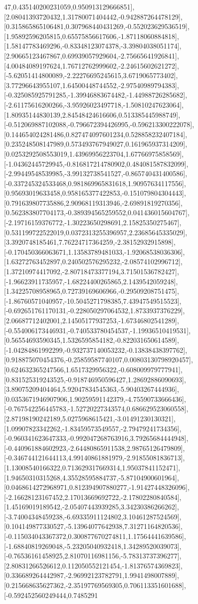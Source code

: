 \documentclass{article}
\begin{document}
47,0.435140200231059,0.950913129666851],[2.08041393720432,1.31780071404442,-0.942887264478129],[0.315865865106481,0.307968440431269,-0.552023629536519],[1.95892596205815,0.65575856617606,-1.87118060884818],[1.58147783469296,-0.83348123074378,-3.39804038051174],[2.90665123467867,0.69939057929604,-2.75665641926841],[4.00484089197624,1.76712762999602,-2.24615602621272],[-5.62051414800089,-2.22276695245615,3.6719065773402],[3.77296643955107,1.64500448744552,-2.97540989794383],[-0.325085925791285,-1.39946883674482,-1.44988726285682],[-2.61175616200266,-3.95926023497718,-1.50810247623064],[1.80935144830139,2.84548424616606,0.513385445988749],[-0.512069887102088,-0.796672394426995,-0.596213300222078],[0.144654024281486,0.827474097601234,0.528858232407184],[0.235248508147989,0.573493767949027,0.161965937314209],[0.0253292508553019,1.43969956223704,1.67766975858569],[-1.04362445729945,-0.816817214780902,0.484081587832099],[-2.99449548539985,-3.99132738541527,-0.865740431400586],[-0.337245324533468,0.981869965831618,1.90957634117556],[0.95693019633458,0.958165377422853,-0.151079804304443],[0.791639807735886,2.90968119313946,-2.69891819270356],[0.562383807704173,-0.389394565259552,0.041436015604767],[-2.19716159376772,-1.30223650298691,2.15825350275467],[0.531199722522019,0.0372313255396957,2.23685645335029],[3.3920748185461,7.76224717364259,-2.38152932915898],[-0.170450366063671,1.13583789481033,-1.92068538036306],[1.63272763452897,0.240502576295232,-2.08574102996712],[1.37210974417092,-2.80718473377194,3.71501536782427],[-1.96623911735957,-1.68224400265865,2.1439542059248],[1.34225708958965,0.72739169606966,-0.29509208751475],[-1.86760571040957,-10.5045271798385,7.43947549515523],[-0.692651761170131,-0.228050297064532,1.8733937376229],[2.06687712402001,2.14505177937253,-1.67346802541289],[-0.554006173446931,-0.740533780454537,-1.19936510419531],[0.56554693590345,1.5326595854182,-0.822031650614589],[-1.04284861992299,-0.932737140053232,-0.13838438397762],[0.918875070454376,-0.25859587740107,0.00803130798920457],[0.624632365247566,1.6517329956322,-0.608009979777941],[0.831525319243525,-0.918746950596427,1.28692886090693],[3.89075209404464,5.92047834545363,-5.90403267444936],[0.0353671946907906,1.90259591142379,-4.75590733666436],[-0.767542256445783,-1.52720227343574,0.686629523060558],[2.87198190242189,5.0275968615421,-3.01491230130321],[1.09907823342262,-1.83459573549557,-2.79479241734356],[-0.960341623647333,-0.992047268763916,3.79265684444948],[-0.440961884602923,-2.64480865911538,2.98765126479809],[-0.346744121644113,4.99140861881979,-2.91855081836713],[1.13008540166322,0.713629317669314,1.95037841152471],[1.94650310315268,4.35528595884737,-5.87104900601964],[0.0468614272968971,0.812394907880277,-1.91427448326096],[-2.16628123167452,2.17013669692722,-2.17802280840584],[1.45169019189542,-2.05407443939285,3.34230386266262],[-3.74004348459238,-6.69335911124802,3.10461287524569],[0.104149877330527,-5.13964077642938,7.31271164820536],[-0.115034043367372,0.300877670274811,1.17564441639586],[-1.68840819269048,-5.23205040932418,1.34289520039073],[-0.76536161458925,2.81070116981156,-5.78313737396277],[2.80831266526612,0.112050552121454,-1.81376574369823],[0.336689264442987,-2.96992123782791,1.9941498007889],[0.215668635627362,-2.35197769569305,0.706113351601688],[-0.592452560249444,0.7485291
\end{document}
